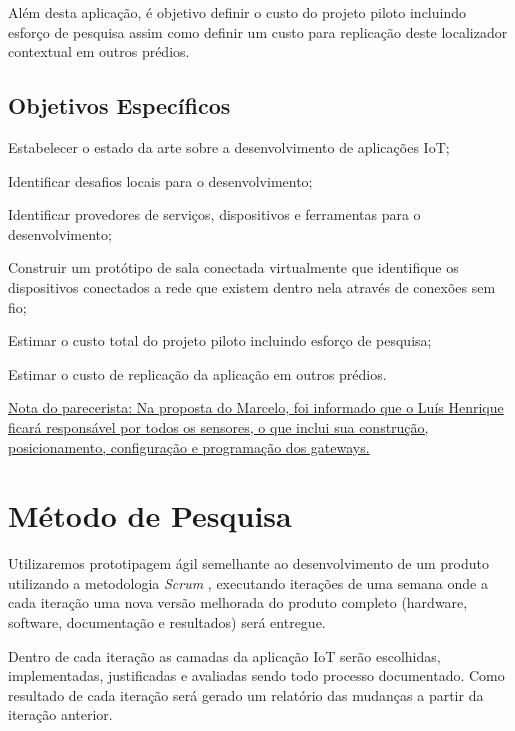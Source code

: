 \documentclass[
	12pt,				%
	openright,			%
	oneside,			%
	a4paper,			%
	chapter=TITLE,		%
	english,			%
	french,				%
	spanish,			%
	brazil				%
	]{abntex2}
\begin{document}
{Além desta aplicação, é objetivo definir o custo do projeto piloto incluindo esforço de pesquisa assim como definir um custo para replicação deste localizador contextual em outros prédios.

\section{Objetivos Específicos}

\begin{alineas}
	\item Estabelecer o estado da arte sobre a desenvolvimento de aplicações IoT;
	\item Identificar desafios locais para o desenvolvimento;
	\item Identificar provedores de serviços, dispositivos e ferramentas para o desenvolvimento;
	\item Construir um protótipo de sala conectada virtualmente que identifique os dispositivos conectados a rede que existem dentro nela através de conexões sem fio;
	\item Estimar o custo total do projeto piloto incluindo esforço de pesquisa;
	\item Estimar o custo de replicação da aplicação em outros prédios.
\end{alineas}

\underline{Nota do parecerista: Na proposta do Marcelo, foi informado que o Luís Henrique ficará responsável por todos os sensores, o que inclui sua construção, posicionamento, configuração e programação dos gateways.}

\chapter{Método de Pesquisa}

Utilizaremos prototipagem ágil semelhante ao desenvolvimento de um produto utilizando a metodologia \textit{Scrum} \cite{James2016}, executando iterações de uma semana onde a cada iteração uma nova versão melhorada do produto completo (hardware, software, documentação e resultados) será entregue.

Dentro de cada iteração as camadas da aplicação IoT serão escolhidas, implementadas, justificadas e avaliadas sendo todo processo documentado. Como resultado de cada iteração será gerado um relatório das mudanças a partir da iteração anterior.

}
\end{document}
